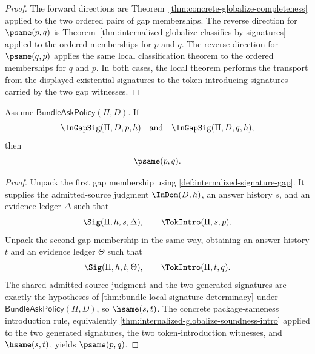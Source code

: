 \begin{proof}
The forward directions are Theorem~\ref{thm:concrete-globalize-completeness} applied to the two ordered pairs of gap memberships. The reverse direction for $\psame(p,q)$ is Theorem~\ref{thm:internalized-globalize-classifies-by-signatures} applied to the ordered memberships for $p$ and $q$. The reverse direction for $\psame(q,p)$ applies the same local classification theorem to the ordered memberships for $q$ and $p$. In both cases, the local theorem performs the transport from the displayed existential signatures to the token-introducing signatures carried by the two gap witnesses.
\end{proof}

\begin{theorem}
\label{thm:bundle-local-internalized-gap-separation}
Assume $\mathsf{BundleAskPolicy}(\Pi,D)$. If
$$
  \InGapSig(\Pi,D,p,h)
  \quad\text{and}\quad
  \InGapSig(\Pi,D,q,h),
$$
then
$$
  \psame(p,q).
$$
\end{theorem}

\begin{proof}
Unpack the first gap membership using \autoref{def:internalized-signature-gap}. It supplies the admitted-source judgment $\InDom(D,h)$, an answer history $s$, and an evidence ledger $\Delta$ such that
$$
  \Sig(\Pi,h,s,\Delta),
  \qquad
  \TokIntro(\Pi,s,p).
$$
Unpack the second gap membership in the same way, obtaining an answer history $t$ and an evidence ledger $\Theta$ such that
$$
  \Sig(\Pi,h,t,\Theta),
  \qquad
  \TokIntro(\Pi,t,q).
$$
The shared admitted-source judgment and the two generated signatures are exactly the hypotheses of \autoref{thm:bundle-local-signature-determinacy} under $\mathsf{BundleAskPolicy}(\Pi,D)$, so $\hsame(s,t)$. The concrete package-sameness introduction rule, equivalently \autoref{thm:internalized-globalize-soundness-intro} applied to the two generated signatures, the two token-introduction witnesses, and $\hsame(s,t)$, yields $\psame(p,q)$.
\end{proof}

